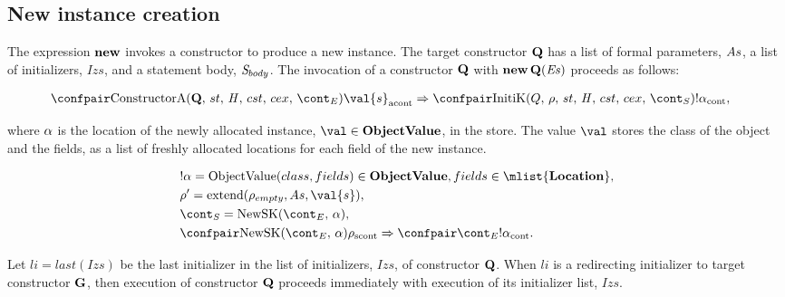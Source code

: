 \documentclass[a4paper,oneside]{article}
\DeclareMathOperator{\extend}{extend}
\newcommand{\synt}[1]{\ensuremath{\text{\textbf{#1}}}}
\DeclareMathOperator{\new}{\synt{new}}
\newcommand{\cesktrans}[2]{\ensuremath{{#1} \Rightarrow {#2}}}
\begin{document}
\subsection{New instance creation}

\newcommand{\Initializer}[1]{\mathrm{Initializer}(#1)}
\newcommand{\SuperInitializer}[2]{\mathrm{SuperInitializer}(#1,\,#2)}
\newcommand{\RedirectingInitializer}[2]{\mathrm{RedirectingInitializer}(#1,\,#2)}

The expression $\new$ invokes a constructor to produce a new instance.
The target constructor $\synt{Q}$ has a list of formal parameters, $As$, a list of initializers, $Izs$, and a statement body, $\mathit{S}_{body}$.
The invocation of a constructor $\synt{Q}$ with $\new \synt{Q}(\exprs)$ proceeds as follows:

\begin{align*}
    &\cesktrans%
        {\acontconf{\ConstructorA{\synt{Q}}{\econt}}{\val{s}}}%
        {\contconf{\InitK{Q}{\env}{\scont}}{!\loc}},
\end{align*}

\noindent where $\alpha$ is the location of the newly allocated instance, $\val \in \dobjval$, in the store.
The value $\val$ stores the class of the object and the fields, as a list of freshly allocated locations for each field of the new instance.

\begin{align*}
    &\deref{\loc} = \objval \in \dobjval, fields \in \mlist{\dlocation},\\
    &\env' = \extend(\env_{empty}, \formals, \val{s}),\\
    &\scont = \NewSK{\econt}{\loc},\\
    &\cesktrans{\scontconf{\NewSK{\econt}{\loc}}{\env}}{\contconf{\econt}{\deref{\loc}}}.
\end{align*}

Let $li = last(Izs)$ be the last initializer in the list of initializers, $Izs$, of constructor $\synt{Q}$.
When $li$ is a redirecting initializer to target constructor $\synt{G}$, then execution of constructor $\synt{Q}$ proceeds immediately with execution of its initializer list, $Izs$.
\end{document}
